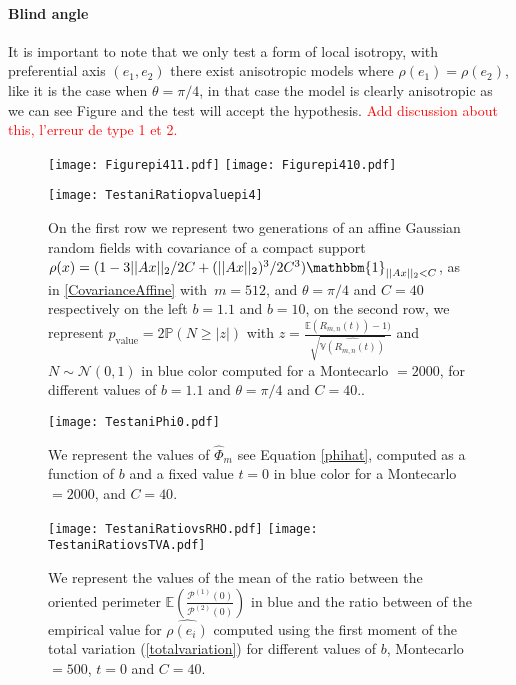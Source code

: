 \documentclass[12pt]{article}
\renewcommand{\hat}{\widehat}
\theoremstyle{Theorem}
\theoremstyle{definition}
\newcounter{Ax}
\begin{document}
\paragraph{Blind angle}It is important to note that we only test a form of local isotropy, with preferential axis $(e_1,e_2)$ there exist anisotropic models where $\rho(e_1) = \rho(e_2)$, like it is the case when $\theta = \pi/4$, in that case the model is clearly anisotropic as we can see Figure and the test will accept the hypothesis. \textcolor{red}{Add discussion about this, l'erreur de type 1 et 2.}
\begin{figure}[H]
  \centering
    {\texttt{[image: Figurepi411.pdf]}} \hspace{-1cm}
      {\texttt{[image: Figurepi410.pdf]}}
      \end{figure}
      \vspace{-3cm}
      \begin{figure}[H]
      \hspace{-0.5cm}
        \centering
    {\texttt{[image: TestaniRatiopvaluepi4]}}
 \caption{On the first row we represent two generations of an affine Gaussian random fields with covariance of a compact support $\rho(x) = (1 - 3||Ax||_{2}/2C + (||Ax||_{2})^{3}/2C^{3})\mathbbm{1}_{||Ax||_{2} < C}$, as in \eqref{CovarianceAffine} with~$m = 512$, and $\theta = \pi/4$ and $C = 40$ respectively on the left $b = 1.1$ and $b = 10$, on the second row, we represent $p_{\text{value}} = 2\mathbb{P}\left(N \geq |z|\right)$ with $z = \frac{\mathbb{E}\left(R_{m,n}(t)\right) - 1)}{\sqrt{\hat{\mathbb{V}\left(R_{m, n}(t)\right)}}}$ and $N \sim \mathcal{N}(0,1)$ in blue color computed for a Montecarlo $= 2000$, for different values of $b = 1.1$ and $\theta = \pi/4$ and $C = 40$..}
\end{figure}
\begin{figure}[H]
  \centering
    {\texttt{[image: TestaniPhi0.pdf]}}
    \hspace{0.2cm} 
 \caption{We represent the values of $\hat{\Phi}_{m}$ see Equation \eqref{phihat}, computed as a function of $b$ and a fixed value $t=0$ in blue color for a Montecarlo $= 2000$, and $C = 40$.}
\end{figure}
\begin{figure}[H]
  \centering
    {\texttt{[image: TestaniRatiovsRHO.pdf]}}
    {\texttt{[image: TestaniRatiovsTVA.pdf]}}
    \hspace{0.2cm} 
 \caption{We represent the values of the mean of the ratio between the oriented perimeter $\mathbb{E}\left(\frac{\mathcal{P}^{(1)}(0)}{\mathcal{P}^{(2)}(0)}\right)$ in blue and the ratio between of the empirical value for $\hat{\rho(e_i)}$ computed using the first moment of the total variation (\ref{totalvariation}) for different values of $b$, Montecarlo $= 500$, $t = 0$ and $C = 40$.}
\end{figure}
\end{document}
